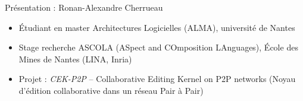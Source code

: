 \begin{frame}{Pr\'esentation : Ronan-Alexandre Cherrueau}
\begin{itemize}
  \item Étudiant en master Architectures Logicielles (ALMA), université de
  Nantes
  \item Stage recherche ASCOLA (ASpect and COmposition LAnguages), École des
  Mines de Nantes (LINA, Inria)
  \item Projet : \emph{CEK-P2P} -- Collaborative Editing Kernel on P2P networks
  (Noyau d'édition collaborative dans un réseau Pair à Pair)
\end{itemize}
\end{frame}

